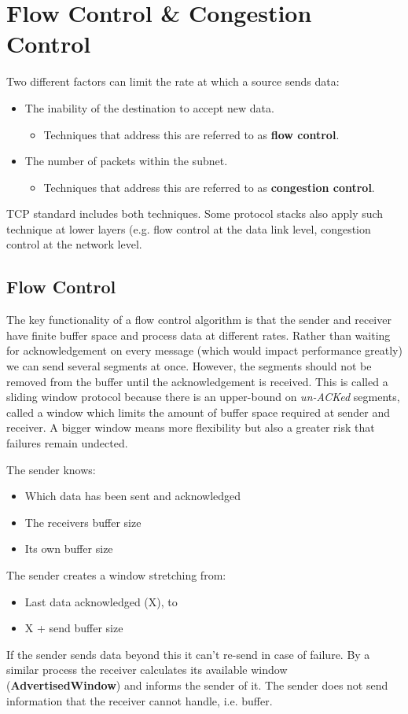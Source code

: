 \documentclass[11pt]{article}
\begin{document}
\section{Flow Control \& Congestion Control}
\label{sec:orgff0065f}
Two different factors can limit the rate at which a source sends data:
\begin{itemize}
\item The inability of the destination to accept new data.
\begin{itemize}
\item Techniques that address this are referred to as \textbf{flow control}.
\end{itemize}
\item The number of packets within the subnet.
\begin{itemize}
\item Techniques that address this are referred to as \textbf{congestion control}.
\end{itemize}
\end{itemize}
TCP standard includes both techniques.
Some protocol stacks also apply such technique at lower layers (e.g. flow control at the data link level, congestion control at the network level.

\subsection{Flow Control}
\label{sec:org05f055d}
The key functionality of a flow control algorithm is that the sender and receiver have finite buffer space and process data at different rates.
Rather than waiting for acknowledgement on every message (which would impact performance greatly) we can send several segments at once.
However, the segments should not be removed from the buffer until the acknowledgement is received.
This is called a sliding window protocol because there is an upper-bound on \emph{un-ACKed} segments, called a window which limits the amount of buffer space required at sender and receiver.
A bigger window means more flexibility but also a greater risk that failures remain undected.

The sender knows:
\begin{itemize}
\item Which data has been sent and acknowledged
\item The receivers buffer size
\item Its own buffer size
\end{itemize}
The sender creates a window stretching from:
\begin{itemize}
\item Last data acknowledged (X), to
\item X + send buffer size
\end{itemize}
If the sender sends data beyond this it can't re-send in case of failure.
By a similar process the receiver calculates its available window (\textbf{AdvertisedWindow}) and informs the sender of it.
The sender does not send information that the receiver cannot handle, i.e. buffer.
\end{document}
